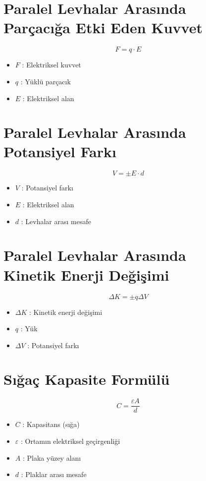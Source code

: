 \documentclass[a4paper, 11pt, titlepage]{article}
\begin{document}
\section[P.L.A. Parçacığa Etki Eden Kuvvet]{Paralel Levhalar Arasında \\Parçacığa Etki Eden Kuvvet}
\[
F = q\cdot E
\]
\begin{itemize}
  \item $F$ : Elektriksel kuvvet
  \item $q$ : Yüklü parçacık
  \item $E$ : Elektriksel alan
\end{itemize}

\section[P.L.A. Potansiyel Farkı]{Paralel Levhalar Arasında \\Potansiyel Farkı}
\[
V = \pm E \cdot d
\]
\begin{itemize}
  \item $V$ : Potansiyel farkı
  \item $E$ : Elektriksel alan
  \item $d$ : Levhalar arası mesafe
\end{itemize}

\section[P.L.A. Kinetik Enerji Değişimi]{Paralel Levhalar Arasında \\Kinetik Enerji Değişimi}
\[
\Delta K = \pm q \Delta V
\]
\begin{itemize}
  \item $\Delta K$ : Kinetik enerji değişimi
  \item $q$ : Yük
  \item $\Delta V$ : Potansiyel farkı
\end{itemize}

\section{Sığaç Kapasite Formülü}
\[
C = \frac{\varepsilon A}{d}
\]
\begin{itemize}
  \item $C$ : Kapasitans (sığa)
  \item $\varepsilon$ : Ortamın elektriksel geçirgenliği
  \item $A$ : Plaka yüzey alanı
  \item $d$ : Plaklar arası mesafe
\end{itemize}
\end{document}
